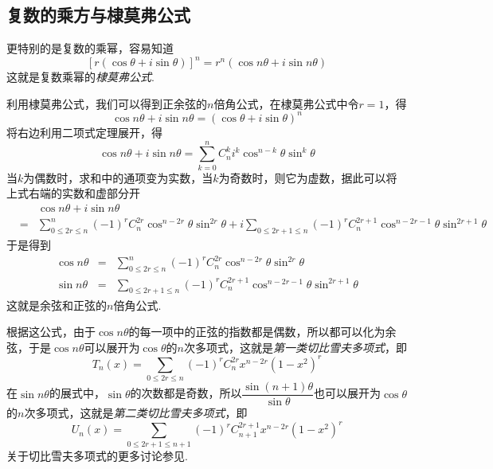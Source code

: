\subsection{复数的乘方与棣莫弗公式}
\label{sec:demoivre-formual}


更特别的是复数的乘幂，容易知道
\begin{equation}
  \label{eq:de-moivre-formula}
  [r(\cos{\theta}+i\sin{\theta})]^n = r^n(\cos{n\theta}+i\sin{n\theta})
\end{equation}
这就是复数乘幂的\emph{棣莫弗公式}.

\begin{example}
  利用棣莫弗公式，我们可以得到正余弦的$n$倍角公式，在棣莫弗公式中令$r=1$，得
  \[ \cos{n\theta}+i\sin{n\theta} = (\cos{\theta}+i\sin{\theta})^n \]
  将右边利用二项式定理展开，得
  \[ \cos{n\theta}+i\sin{n\theta} = \sum_{k=0}^n C_n^k i^k \cos^{n-k}{\theta}\sin^k{\theta} \]
  当$k$为偶数时，求和中的通项变为实数，当$k$为奇数时，则它为虚数，据此可以将上式右端的实数和虚部分开
  \begin{eqnarray*}
   && \cos{n\theta}+i\sin{n\theta}  \\
    & = & \sum_{0 \leqslant 2r \leqslant n}^n (-1)^rC_n^{2r} \cos^{n-2r}{\theta}\sin^{2r}{\theta} + i\sum_{0 \leqslant 2r+1 \leqslant n}(-1)^rC_n^{2r+1} \cos^{n-2r-1}{\theta}\sin^{2r+1}{\theta} 
  \end{eqnarray*}
  于是得到
  \begin{eqnarray}
    \label{eq:cos-sin-of-n-theta}
    \cos{n\theta} & = & \sum_{0 \leqslant 2r \leqslant n}^n (-1)^rC_n^{2r} \cos^{n-2r}{\theta}\sin^{2r}{\theta} \\
    \sin{n\theta} & = & \sum_{0 \leqslant 2r+1 \leqslant n}(-1)^rC_n^{2r+1} \cos^{n-2r-1}{\theta}\sin^{2r+1}{\theta}
  \end{eqnarray}
  这就是余弦和正弦的$n$倍角公式.

  根据这公式，由于$\cos{n\theta}$的每一项中的正弦的指数都是偶数，所以都可以化为余弦，于是$\cos{n\theta}$可以展开为$\cos{\theta}$的$n$次多项式，这就是\emph{第一类切比雪夫多项式}，即
  \[ T_n(x) = \sum_{0 \leqslant 2r\leqslant n}(-1)^rC_n^{2r}x^{n-2r}(1-x^2)^r \]
  在$\sin{n\theta}$的展式中，$\sin{\theta}$的次数都是奇数，所以$\dfrac{\sin{(n+1)\theta}}{\sin{\theta}}$也可以展开为$\cos{\theta}$的$n$次多项式，这就是\emph{第二类切比雪夫多项式}，即
  \[ U_n(x)=\sum_{0 \leqslant 2r+1 \leqslant n+1}(-1)^rC_{n+1}^{2r+1}x^{n-2r}(1-x^2)^r \]
  关于切比雪夫多项式的更多讨论参见\cite{elementary-math-notes}.
\end{example}

